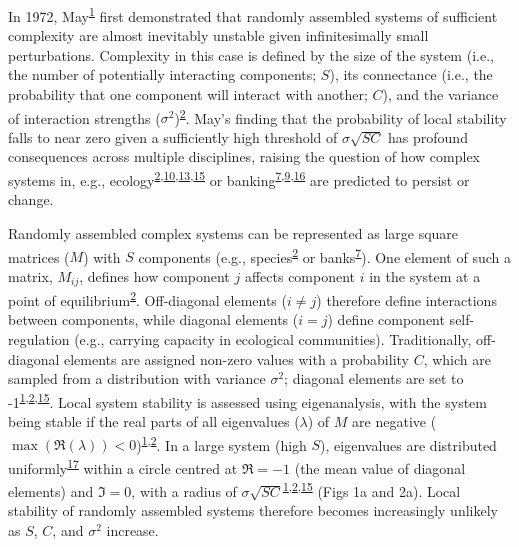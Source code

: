 \documentclass[]{article}
\begin{document}
In 1972, May\textsuperscript{\protect\hyperlink{ref-May1972}{1}} first
demonstrated that randomly assembled systems of sufficient complexity
are almost inevitably unstable given infinitesimally small
perturbations. Complexity in this case is defined by the size of the
system (i.e., the number of potentially interacting components; \(S\)), its 
connectance (i.e., the probability that one component will interact with 
another; \(C\)), and the variance of interaction strengths
(\(\sigma^{2}\))\textsuperscript{\protect\hyperlink{ref-Allesina2012}{2}}.
May's finding that the probability of local stability falls to near zero
given a sufficiently high threshold of \(\sigma\sqrt{SC}\) has profound
consequences across multiple disciplines, raising the question of how
complex systems in, e.g.,
ecology\textsuperscript{\protect\hyperlink{ref-Allesina2012}{2},\protect\hyperlink{ref-Mougi2012}{10},\protect\hyperlink{ref-Grilli2017}{13},\protect\hyperlink{ref-Allesina2015}{15}}
or
banking\textsuperscript{\protect\hyperlink{ref-Haldane2011}{7},\protect\hyperlink{ref-Bardoscia2017}{9},\protect\hyperlink{ref-May2008}{16}}
are predicted to persist or change.

Randomly assembled complex systems can be represented as large square
matrices (\(M\)) with \(S\) components (e.g.,
species\textsuperscript{\protect\hyperlink{ref-Allesina2012}{2}} or
banks\textsuperscript{\protect\hyperlink{ref-Haldane2011}{7}}). One
element of such a matrix, \(M_{ij}\), defines how component \(j\) affects
component \(i\) in the system at a point of
equilibrium\textsuperscript{\protect\hyperlink{ref-Allesina2012}{2}}.
Off-diagonal elements (\(i \neq j\)) therefore define interactions
between components, while diagonal elements (\(i = j\)) define component
self-regulation (e.g., carrying capacity in ecological communities).
Traditionally, off-diagonal elements are assigned non-zero
values with a probability \(C\), which are sampled from a distribution
with variance \(\sigma^{2}\); diagonal elements are set to
-1\textsuperscript{\protect\hyperlink{ref-May1972}{1},\protect\hyperlink{ref-Allesina2012}{2},\protect\hyperlink{ref-Allesina2015}{15}}.
Local system stability is assessed using eigenanalysis, with the system
being stable if the real parts of all eigenvalues (\(\lambda\)) of \(M\)
are negative
(\(\max\left(\Re(\lambda)\right) < 0\))\textsuperscript{\protect\hyperlink{ref-May1972}{1},\protect\hyperlink{ref-Allesina2012}{2}}.
In a large system (high \(S\)), eigenvalues are distributed
uniformly\textsuperscript{\protect\hyperlink{ref-Tao2010}{17}} within a
circle centred at \(\Re = -1\) (the mean value of diagonal elements) and
\(\Im = 0\), with a radius of
\(\sigma\sqrt{SC}\)\textsuperscript{\protect\hyperlink{ref-May1972}{1},\protect\hyperlink{ref-Allesina2012}{2},\protect\hyperlink{ref-Allesina2015}{15}}
(Figs 1a and 2a). Local stability of randomly assembled systems
therefore becomes increasingly unlikely as \(S\), \(C\), and
\(\sigma^{2}\) increase.
\end{document}
